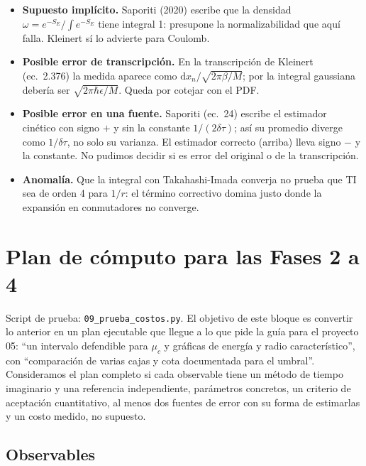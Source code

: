 \documentclass[11pt]{article}
\newcommand{\dd}{\mathrm{d}}
\begin{document}
\begin{itemize}
\item \textbf{Supuesto implícito.} Saporiti (2020) escribe que la densidad $\omega=e^{-S_E}/\int e^{-S_E}$ tiene integral 1: presupone la normalizabilidad que aquí falla. Kleinert sí lo advierte para Coulomb.
\item \textbf{Posible error de transcripción.} En la transcripción de Kleinert (ec.~2.376) la medida aparece como $\dd x_n/\sqrt{2\pi\beta/M}$; por la integral gaussiana debería ser $\sqrt{2\pi\hbar\epsilon/M}$. Queda por cotejar con el PDF.
\item \textbf{Posible error en una fuente.} Saporiti (ec.~24) escribe el estimador cinético con signo $+$ y sin la constante $1/(2\delta\tau)$; así su promedio diverge como $1/\delta\tau$, no solo su varianza. El estimador correcto (arriba) lleva signo $-$ y la constante. No pudimos decidir si es error del original o de la transcripción.
\item \textbf{Anomalía.} Que la integral con Takahashi-Imada converja no prueba que TI sea de orden 4 para $1/r$: el término correctivo domina justo donde la expansión en conmutadores no converge.
\end{itemize}

\section{Plan de cómputo para las Fases 2 a 4}
\label{sec:plan}

Script de prueba: \texttt{09\_prueba\_costos.py}. El objetivo de este bloque es convertir lo anterior en un plan ejecutable que llegue a lo que pide la guía para el proyecto 05: ``un intervalo defendible para $\mu_c$ y gráficas de energía y radio característico'', con ``comparación de varias cajas y cota documentada para el umbral''. Consideramos el plan completo si cada observable tiene un método de tiempo imaginario y una referencia independiente, parámetros concretos, un criterio de aceptación cuantitativo, al menos dos fuentes de error con su forma de estimarlas y un costo medido, no supuesto.

\subsection{Observables}
\end{document}
